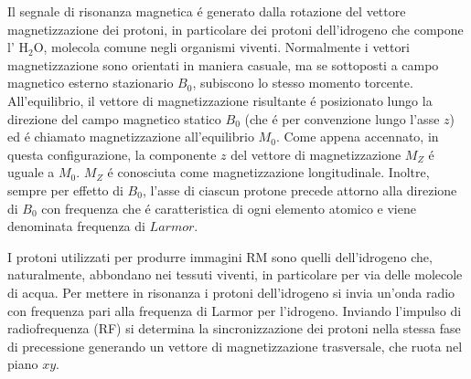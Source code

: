 \documentclass[a4paper,12pt]{report}
\begin{document}
 Il segnale di risonanza magnetica \'e generato dalla rotazione del vettore magnetizzazione dei protoni, in particolare dei protoni dell'idrogeno che compone l' $\mbox{H}_2\mbox{O}$, molecola comune negli organismi viventi. 
 Normalmente i vettori magnetizzazione sono orientati in maniera casuale, ma se sottoposti a campo magnetico esterno stazionario $B_0$, subiscono lo stesso momento torcente.
 All'equilibrio, il vettore di magnetizzazione risultante \'e posizionato lungo la direzione del campo magnetico statico $B_0$ (che \'e per convenzione lungo l'asse $z$) ed \'e chiamato magnetizzazione all'equilibrio $M_0$. 
 Come appena accennato, in questa configurazione, la componente $z$ del vettore di magnetizzazione $M_Z$ \'e uguale a $M_0$. 
 $M_Z$ \'e conosciuta come magnetizzazione longitudinale. 
 Inoltre, sempre per effetto di $B_0$, l'asse di ciascun protone precede attorno alla direzione di $B_0$ con frequenza che \'e caratteristica di ogni elemento atomico e viene denominata frequenza di $Larmor$.
 
 I protoni utilizzati per produrre immagini RM sono quelli dell'idrogeno che, naturalmente, abbondano nei tessuti viventi, in particolare per via delle molecole di acqua.
 Per mettere in risonanza i protoni dell'idrogeno si invia un'onda radio con frequenza pari alla frequenza di Larmor per l'idrogeno.
 Inviando l'impulso di radiofrequenza (RF) si determina la sincronizzazione dei protoni nella stessa fase di precessione generando un vettore di magnetizzazione trasversale, che ruota nel piano $xy$.
 
\end{document}
